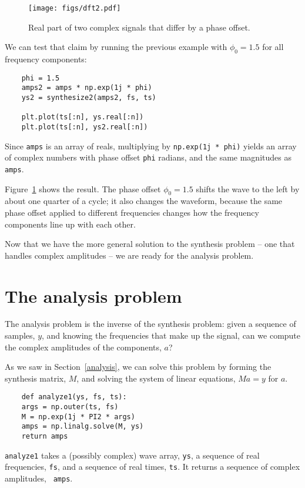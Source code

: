 \begin{figure}
	\centerline{\texttt{[image: figs/dft2.pdf]}}
	\caption{Real part of two complex signals that differ by a phase
		offset.}
	\label{fig.dft2}
\end{figure}

We can test that claim by running the previous example with
$\phi_0 = 1.5$ for all frequency components:

\begin{verbatim}
	phi = 1.5
	amps2 = amps * np.exp(1j * phi)
	ys2 = synthesize2(amps2, fs, ts)
	
	plt.plot(ts[:n], ys.real[:n])
	plt.plot(ts[:n], ys2.real[:n])
\end{verbatim}

Since {\tt amps}
is an array of reals, multiplying by {\tt np.exp(1j * phi)} yields
an array of complex numbers with phase offset {\tt phi} radians, and
the same magnitudes as {\tt amps}.

Figure~\ref{fig.dft2} shows the result.  The phase offset
$\phi_0 = 1.5$ shifts the wave to the left by about one quarter of
a cycle; it also changes the waveform, because the same phase
offset applied to different frequencies changes how the frequency
components line up with each other.

Now that we have the more general solution to the synthesis problem --
one that handles complex amplitudes -- we are ready for the analysis
problem.


\section{The analysis problem}

The analysis problem is the inverse of the synthesis problem: given a
sequence of samples, $y$, and knowing the frequencies
that make up the signal, can we compute the complex amplitudes of the
components, $a$?

As we saw in Section~\ref{analysis}, we can solve this problem by forming
the synthesis matrix, $M$, and solving the system of linear
equations, $M a = y$ for $a$.

\begin{verbatim}
	def analyze1(ys, fs, ts):
	args = np.outer(ts, fs)
	M = np.exp(1j * PI2 * args)
	amps = np.linalg.solve(M, ys)
	return amps
\end{verbatim}

{\tt analyze1} takes a (possibly complex) wave array, {\tt ys}, a
sequence of real frequencies, {\tt fs}, and a sequence of real
times, {\tt ts}.  It returns a sequence of complex amplitudes, {\tt
	amps}.

